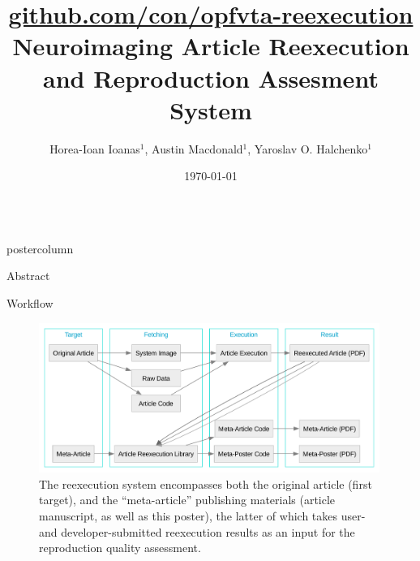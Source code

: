 

\title{
	\href{https://github.com/con/opfvta-reexecution}{
		\Large github.com/con/opfvta-reexecution
	}\\\vspace{.15em}
	Neuroimaging Article Reexecution and Reproduction Assesment System
}
\author{
	Horea-Ioan Ioanas$^{1}$,
	Austin Macdonald$^{1}$,
	Yaroslav O. Halchenko$^{1}$
}
\date{\today}

\newlength{\columnheight}
\setlength{\columnheight}{0.881\textheight}



\begin{frame}
\begin{columns}
	\begin{column}{.42\textwidth}
		\begin{beamercolorbox}[center]{postercolumn}
			\begin{minipage}{.98\textwidth}  %
				\parbox[t][\columnheight]{\textwidth}{ %
					\begin{myblock}{Abstract}
						
					\end{myblock}\vfill
					\vspace{-0.3em}
					\begin{myblock}{Workflow}
						\vspace{0.5em}
						\begin{figure}
							\includegraphics[width=0.99\textwidth]{img/workflow.pdf}
							\caption{
								The reexecution system encompasses both the original article (first target), and the “meta-article” publishing materials (article manuscript, as well as this poster), the latter of which takes user- and developer-submitted reexecution results as an input for the reproduction quality assessment.
}
\end{figure}
\end{myblock}}
\end{minipage}
\end{beamercolorbox}
\end{column}
\end{columns}
\end{frame}

